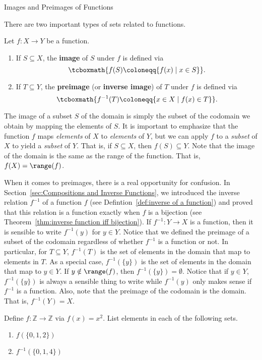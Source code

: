 \begin{section}{Images and Preimages of Functions}\label{sec:Images and Preimages}

There are two important types of sets related to functions.

\begin{definition}
Let $f:X\to Y$ be a function.  \begin{enumerate}[label=\textrm{(\alph*)}]
\item If $S\subseteq X$, the \textbf{image} of $S$ under $f$ is defined via
\[
\tcboxmath{f(S)\coloneqq \{f(x) \mid  x\in S\}}.
\]
\item  If $T\subseteq Y$, the \textbf{preimage} (or \textbf{inverse image}) of $T$ under $f$ is defined via
\[
\tcboxmath{f^{-1}(T)\coloneqq \{x\in X \mid  f(x)\in T\}}.
\]
\end{enumerate}
\end{definition}

The image of a subset $S$ of the domain is simply the subset of the codomain we obtain by mapping the elements of $S$. It is important to emphasize that the function $f$ maps \emph{elements} of $X$ to \emph{elements} of $Y$, but we can apply $f$ to a \emph{subset} of $X$ to yield a \emph{subset} of $Y$.  That is, if $S\subseteq X$, then $f(S)\subseteq Y$. Note that the image of the domain is the same as the range of the function.  That is, $f(X)=\range(f)$. 

When it comes to preimages, there is a real opportunity for confusion.  In Section~\ref{sec:Compositions and Inverse Functions}, we introduced the inverse relation $f^{-1}$ of a function $f$ (see Defintion~\ref{def:inverse of a function}) and proved that this relation is a function exactly when $f$ is a bijection (see Theorem~\ref{thm:inverse function iff bijection}). If $f^{-1}:Y\to X$ is a function, then it is sensible to write $f^{-1}(y)$ for $y\in Y$.  Notice that we defined the preimage of a subset of the codomain regardless of whether $f^{-1}$ is a function or not. In particular, for $T\subseteq Y$, $f^{-1}(T)$ is the set of elements in the domain that map to elements in $T$. As a special case, $f^{-1}(\{y\})$ is the set of elements in the domain that map to $y\in Y$.  If $y\notin \range(f)$, then $f^{-1}(\{y\})=\emptyset$. Notice that if $y\in Y$, $f^{-1}(\{y\})$ is always a sensible thing to write while $f^{-1}(y)$ only makes sense if $f^{-1}$ is a function. Also, note that the preimage of the codomain is the domain.  That is, $f^{-1}(Y)=X$.

\begin{problem}
Define $f:\mathbb{Z}\to\mathbb{Z}$ via $f(x)=x^2$. List elements in each of the following sets.
\begin{enumerate}[label=\textrm{(\alph*)}]
\item $f(\{0,1,2\})$
\item $f^{-1}(\{0,1,4\})$
\end{enumerate}
\end{problem}


\end{section}
